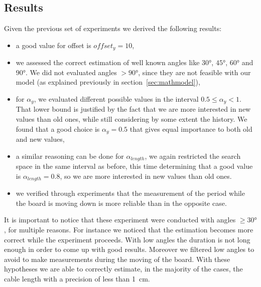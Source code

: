 \subsection{Results}
Given the previous set of experiments we derived the following results:
\begin{itemize}
	\item a good value for offset is $offset_y = 10$,
	\item we assessed the correct estimation of well known angles like $30\si{\degree}$, $45\si{\degree}$, $60\si{\degree}$ and $90\si{\degree}$. We did not evaluated angles $> 90\si{\degree}$, since they are not feasible with our model (as explained previously in section~\ref{sec:mathmodel}),
	\item for $\alpha_y$, we evaluated different possible values in the interval $0.5 \leq \alpha_y < 1 $. That lower bound is justified by the fact that we are more interested in new values than old ones, while still considering by some extent the history. We found that a good choice is $\alpha_y = 0.5$ that gives equal importance to both old and new values,
	\item a similar reasoning can be done for $\alpha_{length}$, we again restricted the search space in the same interval as before, this time determining that a good value is $\alpha_{length} = 0.8$, so we are more interested in new values than old ones.
	\item we verified through experiments that the measurement of the period while the board is moving down is more reliable than in the opposite case.
\end{itemize}
It is important to notice that these experiment were conducted with angles $\geq 30\si{\degree}$, for multiple reasons. For instance we noticed that the estimation becomes more correct while the experiment proceeds. With low angles the duration is not long enough in order to come up with good results. Moreover we filtered low angles to avoid to make measurements during the moving of the board.
With these hypotheses we are able to correctly estimate, in the majority of the cases, the cable length with a precision of less than \SI{1}{\cm}.

